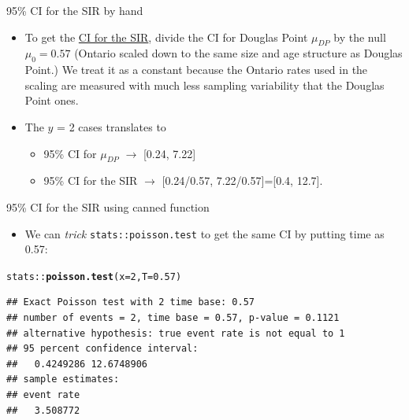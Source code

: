 \documentclass[10pt]{beamer}\usepackage[]{graphicx}\usepackage[]{color}
\makeatletter
\newcommand{\hlnum}[1]{\textcolor[rgb]{0.686,0.059,0.569}{#1}}%
\newcommand{\hlopt}[1]{\textcolor[rgb]{0,0,0}{#1}}%
\newcommand{\hlstd}[1]{\textcolor[rgb]{0.345,0.345,0.345}{#1}}%
\newcommand{\hlkwc}[1]{\textcolor[rgb]{0.333,0.667,0.333}{#1}}%
\newcommand{\hlkwd}[1]{\textcolor[rgb]{0.737,0.353,0.396}{\textbf{#1}}}%
\newenvironment{kframe}{%
 \def\at@end@of@kframe{}%
 \ifinner\ifhmode%
  \def\at@end@of@kframe{\end{minipage}}%
  \begin{minipage}{\columnwidth}%
 \fi\fi%
 \def\FrameCommand##1{\hskip\@totalleftmargin \hskip-\fboxsep
 \colorbox{shadecolor}{##1}\hskip-\fboxsep
     \hskip-\linewidth \hskip-\@totalleftmargin \hskip\columnwidth}%
 \MakeFramed {\advance\hsize-\width
   \@totalleftmargin\z@ \linewidth\hsize
   \@setminipage}}%
 {\par\unskip\endMakeFramed%
 \at@end@of@kframe}
\newenvironment{knitrout}{}{} %
\makeatother
\begin{document}
\begin{frame}[fragile]{95\% CI for the SIR by hand}
	
	
	\small
	\begin{itemize}
		\setlength\itemsep{1.2em}
		
		\item To get the \underline{CI for the SIR}, divide the CI for Douglas Point $\mu_{DP}$ by the null $\mu_0 = 0.57$ (Ontario scaled down to the same size and age structure as Douglas Point.) We treat it as a constant because the Ontario rates used in the scaling are measured with much less sampling variability that the Douglas Point ones.
		
		\pause 
		
		\item The $y$ = 2 cases translates to
		\begin{itemize}
			\item 95\% CI for $\mu_{DP}$ $\to$ [0.24, 7.22]
			\item 95\% CI for the SIR $\to$ [0.24/0.57, 7.22/0.57]=[0.4, 12.7].
		\end{itemize}
	\end{itemize}
	
\end{frame}



\begin{frame}[fragile]{95\% CI for the SIR using canned function}
	
	
	\small
	\begin{itemize}
		\setlength\itemsep{1.2em}
		
		\item We can \textit{trick}  \texttt{stats::poisson.test} 
		to get the same CI by putting time as 0.57: 
		
		
	\end{itemize}
	
\begin{knitrout}\tiny
{}\color{fgcolor}\begin{kframe}
\begin{alltt}
\hlstd{stats}\hlopt{::}\hlkwd{poisson.test}\hlstd{(}\hlkwc{x}\hlstd{=}\hlnum{2}\hlstd{,}\hlkwc{T}\hlstd{=}\hlnum{0.57}\hlstd{)}
\end{alltt}
\begin{verbatim}
## Exact Poisson test with 2 time base: 0.57 
## number of events = 2, time base = 0.57, p-value = 0.1121
## alternative hypothesis: true event rate is not equal to 1 
## 95 percent confidence interval:
##   0.4249286 12.6748906 
## sample estimates:
## event rate 
##   3.508772
\end{verbatim}
\end{kframe}
\end{knitrout}
	
\end{frame}
\end{document}
